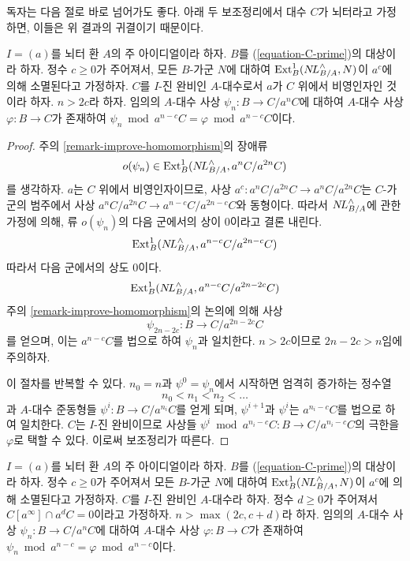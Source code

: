 \noindent
독자는 다음 절로 바로 넘어가도 좋다.
아래 두 보조정리에서 대수 $C$가 뇌터라고 가정하면, 이들은 위 결과의 귀결이기 때문이다.

\begin{lemma}
\label{lemma-get-morphism-nonzerodivisor}
$I = (a)$를 뇌터 환 $A$의 주 아이디얼이라 하자.
$B$를 (\ref{equation-C-prime})의 대상이라 하자.
정수 $c \geq 0$가 주어져서, 모든 $B$-가군 $N$에 대하여
$\mathop{\mathrm{Ext}}\nolimits^1_B(\mathop{N\!L}\nolimits_{B/A}^\wedge, N)$이 $a^c$에 의해 소멸된다고 가정하자.
$C$를 $I$-진 완비인 $A$-대수로서 $a$가 $C$ 위에서 비영인자인 것이라 하자.
$n > 2c$라 하자. 임의의 $A$-대수 사상 $\psi_n : B \to C/a^nC$에 대하여
$A$-대수 사상 $\varphi : B \to C$가 존재하여
$\psi_n \bmod a^{n - c}C = \varphi \bmod a^{n - c}C$이다.
\end{lemma}

\begin{proof}
주의 \ref{remark-improve-homomorphism}의 장애류
$$
o(\psi_n) \in \mathop{\mathrm{Ext}}\nolimits^1_B(\mathop{N\!L}\nolimits_{B/A}^\wedge, a^nC/a^{2n}C)
$$
를 생각하자. $a$는 $C$ 위에서 비영인자이므로,
사상 $a^c : a^nC/a^{2n}C \to a^nC/a^{2n}C$는
$C$-가군의 범주에서 사상 $a^nC/a^{2n}C \to a^{n - c}C/a^{2n - c}C$와 동형이다.
따라서 $\mathop{N\!L}\nolimits_{B/A}^\wedge$에 관한 가정에 의해,
류 $o(\psi_n)$의 다음 군에서의 상이 0이라고 결론 내린다.
$$
\mathop{\mathrm{Ext}}\nolimits^1_B(\mathop{N\!L}\nolimits_{B/A}^\wedge, a^{n - c}C/a^{2n - c}C)
$$
따라서 다음 군에서의 상도 0이다.
$$
\mathop{\mathrm{Ext}}\nolimits^1_B(\mathop{N\!L}\nolimits_{B/A}^\wedge, a^{n - c}C/a^{2n - 2c}C)
$$
주의 \ref{remark-improve-homomorphism}의 논의에 의해 사상
$$
\psi_{2n - 2c} : B \to C/a^{2n - 2c}C
$$
를 얻으며, 이는 $a^{n - c}C$를 법으로 하여 $\psi_n$과 일치한다.
$n > 2c$이므로 $2n - 2c > n$임에 주의하자.

\medskip\noindent
이 절차를 반복할 수 있다. $n_0 = n$과 $\psi^0 = \psi_n$에서 시작하면
엄격히 증가하는 정수열
$$
n_0 < n_1 < n_2 < \ldots
$$
과 $A$-대수 준동형들 $\psi^i : B \to C/a^{n_i}C$를 얻게 되며,
$\psi^{i + 1}$과 $\psi^i$는 $a^{n_i - c}C$를 법으로 하여 일치한다.
$C$는 $I$-진 완비이므로 사상들
$\psi^i \bmod a^{n_i - c}C : B \to C/a^{n_i - c}C$의 극한을
$\varphi$로 택할 수 있다. 이로써 보조정리가 따른다.
\end{proof}

\begin{lemma}
\label{lemma-get-morphism-principal}
$I = (a)$를 뇌터 환 $A$의 주 아이디얼이라 하자.
$B$를 (\ref{equation-C-prime})의 대상이라 하자.
정수 $c \geq 0$가 주어져서 모든 $B$-가군 $N$에 대하여
$\mathop{\mathrm{Ext}}\nolimits^1_B(\mathop{N\!L}\nolimits_{B/A}^\wedge, N)$이 $a^c$에 의해 소멸된다고 가정하자.
$C$를 $I$-진 완비인 $A$-대수라 하자.
정수 $d \geq 0$가 주어져서 $C[a^\infty] \cap a^dC = 0$이라고 가정하자.
$n > \max(2c, c + d)$라 하자. 임의의 $A$-대수 사상
$\psi_n : B \to C/a^nC$에 대하여 $A$-대수 사상
$\varphi : B \to C$가 존재하여
$\psi_n \bmod a^{n - c} = \varphi \bmod a^{n - c}$이다.
\end{lemma}

